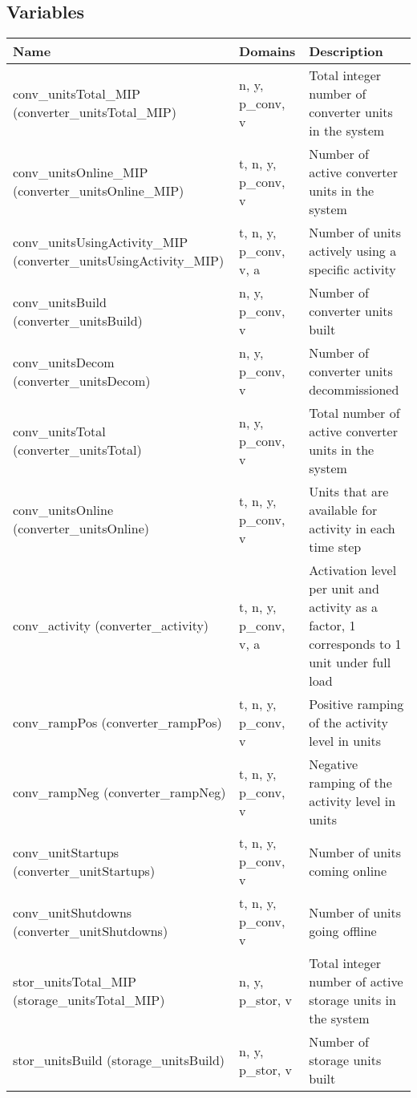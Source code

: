 \documentclass[11pt]{article}
\begin{document}
\subsection*{Variables}
\begin{tabularx}{\textwidth}{| l | l | X |} 
\hline 
\textbf{Name} & \textbf{Domains} & \textbf{Description}\\ 
\hline 
\endhead 
conv\_unitsTotal_MIP (converter\_unitsTotal\_MIP)  & n, y, p\_conv, v & Total integer number of converter units in the system \\ 
conv\_unitsOnline_MIP (converter\_unitsOnline\_MIP)  & t, n, y, p\_conv, v & Number of active converter units in the system \\ 
conv\_unitsUsingActivity\_MIP (converter\_unitsUsingActivity\_MIP)  & t, n, y, p\_conv, v, a & Number of units actively using a specific activity \\ 
conv\_unitsBuild (converter\_unitsBuild)  & n, y, p\_conv, v & Number of converter units built \\ 
conv\_unitsDecom (converter\_unitsDecom)  & n, y, p\_conv, v & Number of converter units decommissioned \\ 
conv\_unitsTotal (converter\_unitsTotal)  & n, y, p\_conv, v & Total number of active converter units in the system \\ 
conv\_unitsOnline (converter\_unitsOnline)  & t, n, y, p\_conv, v & Units that are available for activity in each time step \\ 
conv\_activity (converter\_activity)  & t, n, y, p\_conv, v, a & Activation level per unit and activity as a factor, 1 corresponds to 1 unit under full load \\ 
conv\_rampPos (converter\_rampPos)  & t, n, y, p\_conv, v & Positive ramping of the activity level in units \\ 
conv\_rampNeg (converter\_rampNeg)  & t, n, y, p\_conv, v & Negative ramping of the activity level in units \\ 
conv\_unitStartups (converter\_unitStartups)  & t, n, y, p\_conv, v & Number of units coming online \\ 
conv\_unitShutdowns (converter\_unitShutdowns)  & t, n, y, p\_conv, v & Number of units going offline \\ 
stor\_unitsTotal\_MIP (storage\_unitsTotal\_MIP)  & n, y, p\_stor, v & Total integer number of active storage units in the system \\ 
stor\_unitsBuild (storage\_unitsBuild)  & n, y, p\_stor, v & Number of storage units built \\ 

\end{tabularx}
\end{document}
